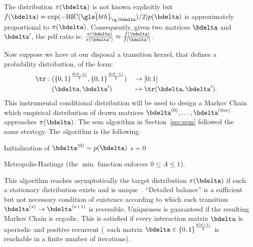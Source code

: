 The distribution $\pi(\bdelta)$ is not known explicitly but $f(\bdelta) = \exp(-\text{BIC}(\hat{\gls{bth}}_{\q,\bdelta})/2) p(\bdelta)$ is approximately proportional to $\pi(\bdelta)$. Consequently, given two matrices $\bdelta$ and $\bdelta'$, the \gls{pdf} ratio is: $\frac{\pi(\bdelta)}{\pi(\bdelta')} \approx \frac{f(\bdelta)}{f(\bdelta')}$.

Now suppose we have at our disposal a transition kernel, that defines a probability distribution, of the form:
\begin{alignat}{2}
\tr: \; & ({\{0,1\}}^{\frac{d(d-1)}{2}},{\{0,1\}}^{\frac{d(d-1)}{2}}) && \to [0;1] \nonumber \\ 
& (\bdelta,\bdelta') && \mapsto \tr(\bdelta,\bdelta'). \nonumber
\end{alignat}
This instrumental conditional distribution will be used to design a Markov Chain which empirical distribution of drawn matrices $\bdelta^{(0)}, \dots, \bdelta^{(\text{iter})}$ approaches $\pi(\bdelta)$. The \gls{sem} algorithm in Section~\ref{sec:sem} followed the same strategy. The algorithm is the following:

\begin{algorithm}[H]
 Initialization of $ \bdelta^{(0)} \sim p(\bdelta)$\;
 $s = 0$\;
\caption{\label{metropolis} Metropolis-Hastings (the $\min$ function enforces $0 \leq A \leq 1$).}
\label{alg:metro}
\end{algorithm}

This algorithm reaches asymptotically the target distribution $\pi(\bdelta)$ if such a stationary distribution exists and is unique~\cite{meyn2012markov}. ``Detailed balance'' is a sufficient but not necessary condition of existence according to which each transition $\bdelta^{(s)} \rightarrow \bdelta^{(s+1)}$ is reversible. Uniqueness is guaranteed if the resulting Markov Chain is ergodic. This is satisfied if every interaction matrix $\bdelta$ is aperiodic and positive recurrent (\ each matrix $\bdelta \in {\{0,1\}}^{\frac{d(d-1)}{2}}$ is reachable in a finite number of iterations). 


